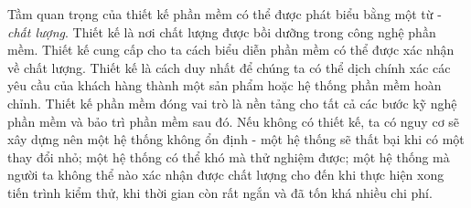 \documentclass[./../SoftwareEngineering.tex]{subfiles}
\begin{document}
	Tầm quan trọng của thiết kế phần mềm có thể được phát biểu bằng một từ - \textit{chất lượng}. Thiết kế là nơi chất lượng được bồi dưỡng trong công nghệ phần mềm. Thiết kế cung cấp cho ta cách biểu diễn phần mềm có thể được xác nhận về chất lượng. Thiết kế là cách duy nhất để chúng ta có thể dịch chính xác các yêu cầu của khách hàng thành một sản phẩm hoặc hệ thống phần mềm hoàn chỉnh. Thiết kế phần mềm đóng vai trò là nền tảng cho tất cả các bước kỹ nghệ phần mềm và bảo trì phần mềm sau đó. Nếu không có thiết kế, ta có nguy cơ sẽ xây dựng nên một hệ thống không ổn định - một hệ thống sẽ thất bại khi có một thay đổi nhỏ; một hệ thống có thể khó mà thử nghiệm được; một hệ thống mà người ta không thể nào xác nhận được chất lượng cho đến khi thực hiện xong tiến trình kiểm thử, khi thời gian còn rất ngắn và đã tốn khá nhiều chi phí.
	
	

	
\end{document}
